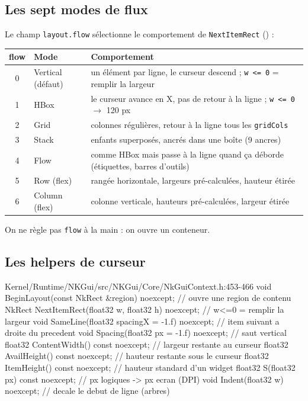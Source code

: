 \subsection{Les sept modes de flux}

Le champ \texttt{layout.flow} sélectionne le comportement de
\texttt{NextItemRect} () :

\begin{center}
\begin{tabular}{@{}clp{}@{}}
\toprule
\textbf{flow} & \textbf{Mode} & \textbf{Comportement} \\
\midrule
0 & Vertical (défaut) & un élément par ligne, le curseur descend ; \texttt{w <= 0} = remplir la largeur \\
1 & HBox              & le curseur avance en X, pas de retour à la ligne ; \texttt{w <= 0} $\rightarrow$ 120 px \\
2 & Grid              & colonnes régulières, retour à la ligne tous les \texttt{gridCols} \\
3 & Stack             & enfants superposés, ancrés dans une boîte (9 ancres) \\
4 & Flow              & comme HBox mais passe à la ligne quand ça déborde (étiquettes, barres d'outils) \\
5 & Row (flex)        & rangée horizontale, largeurs pré-calculées, hauteur étirée \\
6 & Column (flex)     & colonne verticale, hauteurs pré-calculées, largeur étirée \\
\bottomrule
\end{tabular}
\end{center}

On ne règle pas \texttt{flow} à la main : on ouvre un conteneur.

\subsection{Les helpers de curseur}

\begin{nkcode}{Kernel/Runtime/NKGui/src/NKGui/Core/NkGuiContext.h:453-466}
void    BeginLayout(const NkRect &region) noexcept;   // ouvre une region de contenu
NkRect  NextItemRect(float32 w, float32 h) noexcept;  // w<=0 = remplir la largeur
void    SameLine(float32 spacingX = -1.f) noexcept;   // item suivant a droite du precedent
void    Spacing(float32 px = -1.f) noexcept;          // saut vertical
float32 ContentWidth() const noexcept;                // largeur restante au curseur
float32 AvailHeight() const noexcept;                 // hauteur restante sous le curseur
float32 ItemHeight() const noexcept;                  // hauteur standard d'un widget
float32 S(float32 px) const noexcept;                 // px logiques -> px ecran (DPI)
void    Indent(float32 w) noexcept;                   // decale le debut de ligne (arbres)
\end{nkcode}

